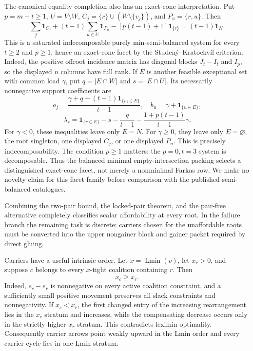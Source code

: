 \documentclass[11pt]{article}
\newcommand{\Lmin}{\operatorname{Lmin}}
\newcommand{\one}{\mathbf 1}
\begin{document}
The canonical equality completion also has an exact-cone interpretation.
Put $p=m-t\ge1$, $U=V\setminus W$,
$C_j=\{r\}\cup(W\setminus\{v_j\})$, and $P_u=\{r,u\}$.  Then
\[
 \sum_j\one_{C_j}+(t-1)\sum_{u\in U}\one_{P_u}
 -[p(t-1)+1]\one_{\{r\}}=(t-1)\one_N.              \tag{CSF}
\]
This is a saturated indecomposable purely min-semi-balanced system for every
$t\ge2$ and $p\ge1$, hence an exact-cone facet by the
Studen\'y--Kratochv\'il criterion.  Indeed, the positive offroot incidence
matrix has diagonal blocks $J_t-I_t$ and $I_p$, so the displayed $n$ columns
have full rank.  If $E$ is another feasible exceptional set with common load
$\gamma$, put $q=|E\cap W|$ and $s=|E\cap U|$.  Its necessarily nonnegative
support coefficients are
\[
 a_j=\frac{\gamma+q-(t-1)\one_{\{v_j\in E\}}}{t-1},\quad
 b_u=\gamma+\one_{\{u\in E\}},
\]
\[
 \lambda_r=\one_{\{r\in E\}}-s-\frac q{t-1}
 -\frac{1+p(t-1)}{t-1}\gamma.                      \tag{CSX}
\]
For $\gamma<0$, these inequalities leave only $E=N$.  For $\gamma\ge0$,
they leave only $E=\varnothing$, the root singleton, one displayed $C_j$,
or one displayed $P_u$.  This is precisely indecomposability.  The condition
$p\ge1$ matters: the $p=0,t=3$ system is decomposable.  Thus the balanced
minimal empty-intersection packing selects a distinguished exact-cone facet,
not merely a nonminimal Farkas row.  We make no novelty claim for this facet
family before comparison with the published semi-balanced catalogues.

Combining the two-pair bound, the locked-pair theorem, and the pair-free
alternative completely classifies scalar affordability at every root.  In
the failure branch the remaining task is discrete: carriers chosen for the
unaffordable roots must be converted into the upper nongainer block and
gainer packet required by direct gluing.

Carriers have a useful intrinsic order.  Let $x=\Lmin(v)$, let $x_r>0$, and
suppose $c$ belongs to every $x$-tight coalition containing $r$.  Then
\[
 x_c\ge x_r.                                           \tag{CMO}
\]
Indeed, $e_c-e_r$ is nonnegative on every active coalition constraint, and a
sufficiently small positive movement preserves all slack constraints and
nonnegativity.  If $x_c<x_r$, the first changed entry of the increasing
rearrangement lies in the $x_c$ stratum and increases, while the compensating
decrease occurs only in the strictly higher $x_r$ stratum.  This contradicts
leximin optimality.  Consequently carrier arrows point weakly upward in the
Lmin order and every carrier cycle lies in one Lmin stratum.
\end{document}
